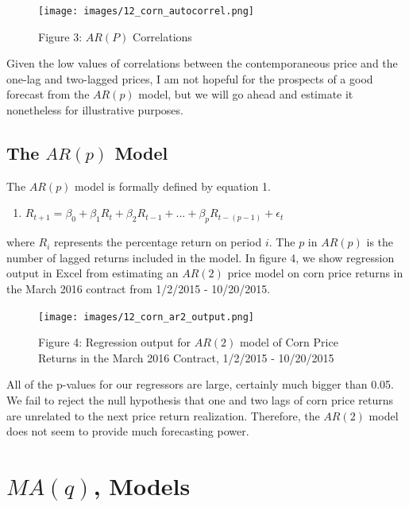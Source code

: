 \documentclass[
]{book}
\providecommand{\tightlist}{%
  \setlength{\itemsep}{0pt}\setlength{\parskip}{0pt}}
\begin{document}
\begin{figure}
\centering
\texttt{[image: images/12\_corn\_autocorrel.png]}
\caption{Figure 3: \(AR(P)\) Correlations}
\end{figure}

Given the low values of correlations between the contemporaneous price and the one-lag and two-lagged prices, I am not hopeful for the prospects of a good forecast from the \(AR(p)\) model, but we will go ahead and estimate it nonetheless for illustrative purposes.

\hypertarget{the-arp-model}{%
\subsection{\texorpdfstring{The \(AR(p)\) Model}{The AR(p) Model}}\label{the-arp-model}}

The \(AR(p)\) model is formally defined by equation 1.

\begin{enumerate}
\def\labelenumi{\arabic{enumi}.}
\tightlist
\item
  \(R_{t+1} = \beta_0 + \beta_1R_{t} + \beta_2R_{t-1}+ ... + \beta_{p}R_{t-(p-1)} + \epsilon_t\)
\end{enumerate}

where \(R_i\) represents the percentage return on period \(i\). The \(p\) in \(AR(p)\) is the number of lagged returns included in the model. In figure 4, we show regression output in Excel from estimating an \(AR(2)\) price model on corn price returns in the March 2016 contract from 1/2/2015 - 10/20/2015.

\begin{figure}
\centering
\texttt{[image: images/12\_corn\_ar2\_output.png]}
\caption{Figure 4: Regression output for \(AR(2)\) model of Corn Price Returns in the March 2016 Contract, 1/2/2015 - 10/20/2015}
\end{figure}

All of the p-values for our regressors are large, certainly much bigger than 0.05. We fail to reject the null hypothesis that one and two lags of corn price returns are unrelated to the next price return realization. Therefore, the \(AR(2)\) model does not seem to provide much forecasting power.

\hypertarget{maq-models}{%
\section{\texorpdfstring{\(MA(q)\), Models}{MA(q), Models}}\label{maq-models}}
\end{document}
